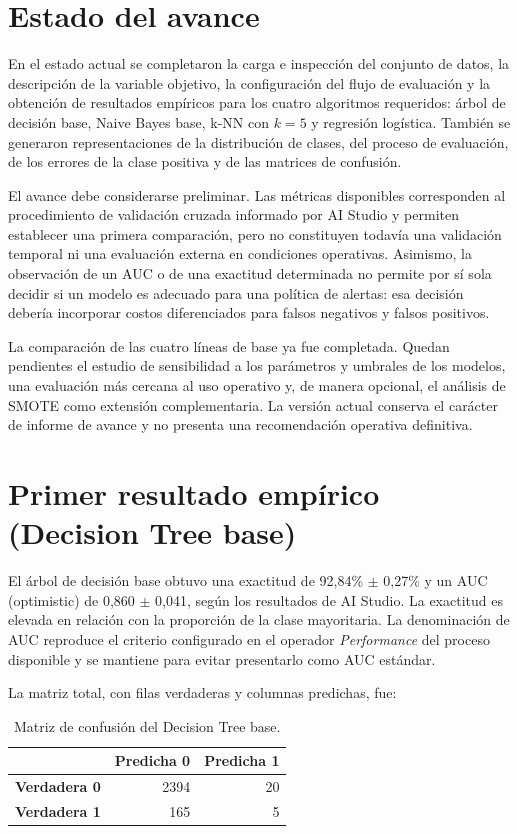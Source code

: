 \documentclass[12pt,a4paper]{article}
\begin{document}
\section{Estado del avance}
En el estado actual se completaron la carga e inspección del conjunto de datos, la descripción de la variable objetivo, la configuración del flujo de evaluación y la obtención de resultados empíricos para los cuatro algoritmos requeridos: árbol de decisión base, Naive Bayes base, k-NN con $k=5$ y regresión logística. También se generaron representaciones de la distribución de clases, del proceso de evaluación, de los errores de la clase positiva y de las matrices de confusión.

El avance debe considerarse preliminar. Las métricas disponibles corresponden al procedimiento de validación cruzada informado por AI Studio y permiten establecer una primera comparación, pero no constituyen todavía una validación temporal ni una evaluación externa en condiciones operativas. Asimismo, la observación de un AUC o de una exactitud determinada no permite por sí sola decidir si un modelo es adecuado para una política de alertas: esa decisión debería incorporar costos diferenciados para falsos negativos y falsos positivos.

La comparación de las cuatro líneas de base ya fue completada. Quedan pendientes el estudio de sensibilidad a los parámetros y umbrales de los modelos, una evaluación más cercana al uso operativo y, de manera opcional, el análisis de SMOTE como extensión complementaria. La versión actual conserva el carácter de informe de avance y no presenta una recomendación operativa definitiva.

\section{Primer resultado empírico (Decision Tree base)}
El árbol de decisión base obtuvo una exactitud de 92,84\% $\pm$ 0,27\% y un AUC (optimistic) de 0,860 $\pm$ 0,041, según los resultados de AI Studio. La exactitud es elevada en relación con la proporción de la clase mayoritaria. La denominación de AUC reproduce el criterio configurado en el operador \textit{Performance} del proceso disponible y se mantiene para evitar presentarlo como AUC estándar.

La matriz total, con filas verdaderas y columnas predichas, fue:
\begin{table}[H]
\centering
\caption{Matriz de confusión del Decision Tree base.}
\label{tab:dt-base-matrix}
\begin{tabular}{lrr}
\toprule
& \textbf{Predicha 0} & \textbf{Predicha 1} \\
\midrule
\textbf{Verdadera 0} & 2394 & 20 \\
\textbf{Verdadera 1} & 165 & 5 \\
\bottomrule
\end{tabular}
\end{table}
\end{document}
